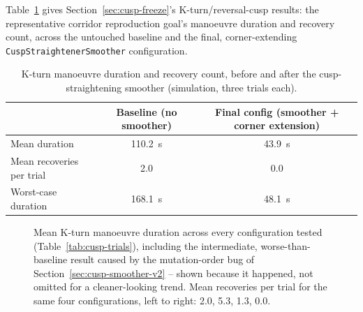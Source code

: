 Table~\ref{tab:results-cusp-summary} gives
Section~\ref{sec:cusp-freeze}'s K-turn/reversal-cusp results: the
representative corridor reproduction goal's manoeuvre duration and
recovery count, across the untouched baseline and the final,
corner-extending \texttt{CuspStraightenerSmoother} configuration.

\begin{table}[htbp]
  \centering
  \caption{K-turn manoeuvre duration and recovery count, before and after the cusp-straightening smoother (simulation, three trials each).}
  \label{tab:results-cusp-summary}
  \begin{tabular}{@{}lcc@{}}
    \toprule
    & Baseline (no smoother) & Final config (smoother + corner extension) \\
    \midrule
    Mean duration & \SI{110.2}{\second} & \SI{43.9}{\second} \\
    Mean recoveries per trial & 2.0 & 0.0 \\
    Worst-case duration & \SI{168.1}{\second} & \SI{48.1}{\second} \\
    \bottomrule
  \end{tabular}
\end{table}

\begin{figure}[htbp]
  \centering
  \caption[Mean K-turn manoeuvre duration by configuration]{Mean K-turn manoeuvre duration across every configuration
    tested (Table~\ref{tab:cusp-trials}), including the intermediate,
    worse-than-baseline result caused by the mutation-order bug of
    Section~\ref{sec:cusp-smoother-v2} -- shown because it happened,
    not omitted for a cleaner-looking trend. Mean recoveries per trial
    for the same four configurations, left to right: 2.0, 5.3, 1.3,
    0.0.}
  \label{fig:cusp-duration-chart}
\end{figure}

